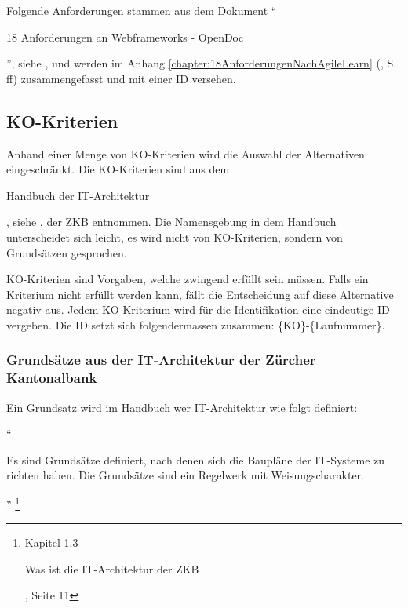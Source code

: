   Folgende Anforderungen stammen aus dem Dokument ``\begin{itshape}18
  Anforderungen an Webframeworks -
  OpenDoc\end{itshape}'', siehe \cite{AnforderungenAnWebframeworks}, und werden
  im Anhang \ref{chapter:18AnforderungenNachAgileLearn}
  (, S.
  \pageref{chapter:18AnforderungenNachAgileLearn}ff) zusammengefasst und mit
  einer ID versehen.

  \subsection{KO-Kriterien}
  
  Anhand einer Menge von KO-Kriterien wird die Auswahl der Alternativen
  eingeschränkt. Die KO-Kriterien sind aus dem \begin{itshape}Handbuch der
  IT-Architektur\end{itshape}, siehe \cite{ZkbHandbuchDerItArchitektur}, der
  \ac{ZKB} entnommen. Die Namensgebung in dem Handbuch unterscheidet sich
  leicht, es wird nicht von KO-Kriterien, sondern von Grundsätzen gesprochen.
  
  KO-Kriterien sind Vorgaben, welche zwingend erfüllt sein müssen. Falls ein
  Kriterium nicht erfüllt werden kann, fällt die Entscheidung auf diese
  Alternative negativ aus. Jedem KO-Kriterium wird für die Identifikation eine
  eindeutige ID vergeben. Die ID setzt sich folgendermassen zusammen: 
  \{KO\}-\{Laufnummer\}.

  \subsubsection{Grundsätze aus der IT-Architektur der Zürcher Kantonalbank}
  
  Ein Grundsatz wird im Handbuch wer IT-Architektur wie folgt definiert:
  \newline
  
  ``\begin{itshape}Es sind Grundsätze definiert, nach denen sich die Baupläne
  der IT-Systeme zu richten haben. Die Grundsätze sind ein Regelwerk mit
  Weisungscharakter.\end{itshape}''
  \footnote{\cite{ZkbHandbuchDerItArchitektur} Kapitel 1.3 - \begin{itshape}Was
  ist die IT-Architektur der ZKB\end{itshape}, Seite 11}
  \newline


